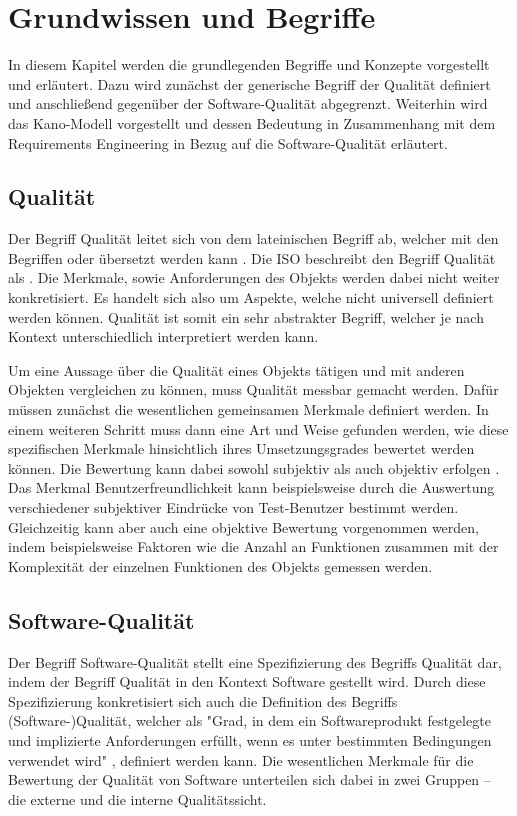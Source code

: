 \section{Grundwissen und Begriffe}
In diesem Kapitel werden die grundlegenden Begriffe und Konzepte vorgestellt und erläutert.
Dazu wird zunächst der generische Begriff der Qualität definiert und anschließend gegenüber der Software-Qualität abgegrenzt.
Weiterhin wird das Kano-Modell vorgestellt und dessen Bedeutung in Zusammenhang mit dem Requirements Engineering in Bezug auf die Software-Qualität erläutert.
\subsection{Qualität}
Der Begriff Qualität leitet sich von dem lateinischen Begriff  ab, welcher mit den Begriffen  oder  übersetzt werden kann \autocite[vgl.][]{noauthor_was_nodate}.
Die \ac{ISO} beschreibt den Begriff Qualität als  \autocite[S. 17]{iso_iso_2015}.
Die Merkmale, sowie Anforderungen des Objekts werden dabei nicht weiter konkretisiert.
Es handelt sich also um Aspekte, welche nicht universell definiert werden können.
Qualität ist somit ein sehr abstrakter Begriff, welcher je nach Kontext unterschiedlich interpretiert werden kann.

Um eine Aussage über die Qualität eines Objekts tätigen und mit anderen Objekten vergleichen zu können, muss Qualität messbar gemacht werden.
Dafür müssen zunächst die wesentlichen gemeinsamen Merkmale definiert werden.
In einem weiteren Schritt muss dann eine Art und Weise gefunden werden, wie diese spezifischen Merkmale hinsichtlich ihres Umsetzungsgrades bewertet werden können.
Die Bewertung kann dabei sowohl subjektiv als auch objektiv erfolgen \autocite[vgl.][S. 53]{shewhart_economic_1931}.
Das Merkmal Benutzerfreundlichkeit kann beispielsweise durch die Auswertung verschiedener subjektiver Eindrücke von Test-Benutzer bestimmt werden.
Gleichzeitig kann aber auch eine objektive Bewertung vorgenommen werden, indem beispielsweise Faktoren wie die Anzahl an Funktionen zusammen mit der Komplexität der einzelnen Funktionen des Objekts gemessen werden.

\subsection{Software-Qualität}\label{sec:SoftwareQualitaet}
Der Begriff Software-Qualität stellt eine Spezifizierung des Begriffs Qualität dar, indem der Begriff Qualität in den Kontext Software gestellt wird.
Durch diese Spezifizierung konkretisiert sich auch die Definition des Begriffs (Software-)Qualität, welcher als "Grad, in dem ein Softwareprodukt festgelegte und implizierte Anforderungen erfüllt, wenn es unter bestimmten Bedingungen verwendet wird" \autocite[S. 17]{iso_iso_2011}, definiert werden kann.
Die wesentlichen Merkmale für die Bewertung der Qualität von Software unterteilen sich dabei in zwei Gruppen -- die externe und die interne Qualitätssicht.

